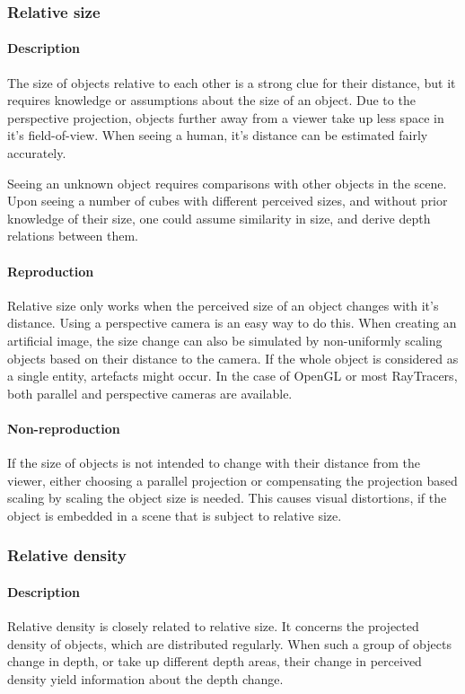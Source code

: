 \subsubsection{Relative size}
\paragraph{Description}
The size of objects relative to each other is a strong clue for their distance, but it requires knowledge or assumptions about the size of an object. Due to the perspective projection, objects further away from a viewer take up less space in it's field-of-view. When seeing a human, it's distance can be estimated fairly accurately.

Seeing an unknown object requires comparisons with other objects in the scene. Upon seeing a number of cubes with different perceived sizes, and without prior knowledge of their size, one could assume similarity in size, and derive depth relations between them.

\paragraph{Reproduction}
Relative size only works when the perceived size of an object changes with it's distance. Using a perspective camera is an easy way to do this. When creating an artificial image, the size change can also be simulated by non-uniformly scaling objects based on their distance to the camera. If the whole object is considered as a single entity, artefacts might occur. In the case of OpenGL or most RayTracers, both parallel and perspective cameras are available.

\paragraph{Non-reproduction}
If the size of objects is not intended to change with their distance from the viewer, either choosing a parallel projection or compensating the projection based scaling by scaling the object size is needed. This causes visual distortions, if the object is embedded in a scene that is subject to relative size.


\subsubsection{Relative density}
\paragraph{Description}
Relative density is closely related to relative size. It concerns the projected density of objects, which are distributed regularly. When such a group of objects change in depth, or take up different depth areas, their change in perceived density yield information about the depth change.

